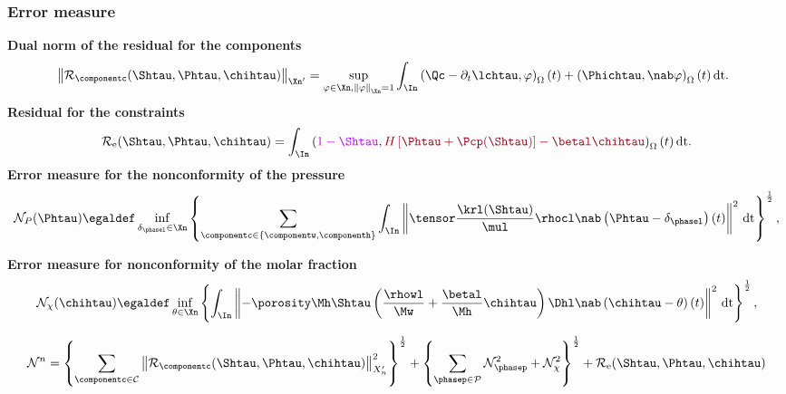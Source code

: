 \documentclass[10 pt]{beamer}
\begin{document}
\begin{frame}
\frametitle{Error measure}
\vspace{-0.2  cm}
\textcolor{cadmiumgreen}{\textbf{Dual norm of the residual for the components}}
\vspace{-0.15 cm}
\begin{equation*}
\hspace{-0.2 cm}\left\|\mathcal{R}_{\componentc}(\Shtau,\Phtau,\chihtau) \right\|_{\Xn'} = \sup_{\varphi \in \Xn, \left\|\varphi\right\|_{\Xn} = 1}  \int_{\In} 
\left(\Qc - \partial_t \lchtau , \varphi\right)_{\Omega}(t) + \left(\Phichtau,\nab \varphi \right)_{\Omega}(t)\,\mathrm{dt} .
\vspace{-0.25 cm}
\end{equation*}
\textcolor{cadmiumgreen}{\textbf{Residual for the constraints}}
\begin{equation*}
  \mathcal{R}_{\mathrm{e}}(\Shtau,\Phtau,\chihtau) = \int_{\In}\left(\textcolor{electricpurple}{1 - \Shtau}, \textcolor{carmine}{H \left[\Phtau + \Pcp(\Shtau)\right] - \betal \chihtau} \right)_{\Omega}(t)\,\mathrm{dt}.
\end{equation*}
\vspace{-0.3 cm} 
\textcolor{cadmiumgreen}{\textbf{Error measure for the nonconformity of the pressure}}
\begin{equation*}
\mathcal{N}_{P}(\Phtau) \egaldef \inf_{\delta_{\phasel} \in \Xn} \left\{\sum_{\componentc \in \left\{ \componentw,\componenth \right\}} \int_{\In} 
  \left\| \tensor \frac{\krl(\Shtau)}{\mul} \rhocl \nab \left(\Phtau-\delta_{\phasel}  \right)(t) \right\|^2 \,\mathrm{dt} \right\}^{\frac{1}{2}},
\end{equation*}

\vspace{-0.15 cm}
\textcolor{cadmiumgreen}{\textbf{Error measure for nonconformity of the molar fraction}}
\vspace{-0.3 cm}
\begin{equation*}
\mathcal{N}_{\chi}(\chihtau) \egaldef\inf_{\theta \in \Xn} \left\{\int_{\In} \left\| -\porosity \Mh \Shtau \left(\frac{\rhowl}{\Mw} + \frac{\betal}{\Mh}\chihtau \right) \Dhl \nab \left(\chihtau-\theta \right)(t) \right\|^2 \,\mathrm{dt} \right\}^\frac{1}{2},
\end{equation*}
\vspace*{-0.3 cm}
\begin{definition}
\vspace{-0.5 cm}
\begin{equation*}
\mathcal{N}^n = \left\{\sum_{\componentc \in\mathcal{C}} \left\|\mathcal{R}_{\componentc}(\Shtau,\Phtau,\chihtau) \right\|_{X_n'}^2 \right\}^{\frac{1}{2}} + \left\{\sum_{\phasep \in \mathcal{P}}\mathcal{N}_{\phasep}^2 + \mathcal{N}_{\chi}^2\right\}^{\frac{1}{2}} + \mathcal{R}_{\mathrm{e}}(\Shtau,\Phtau,\chihtau)
\label{eq:norm:aposteriori}
\end{equation*}
\end{definition}
\end{frame}
\end{document}
